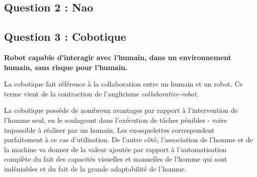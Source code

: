 \subsection{Question 2 : Nao}

\subsection{Question 3 : Cobotique}

\textbf{Robot capable d'interagir avec l'humain, dans un environnement humain, sans
risque pour l'humain.}

La cobotique fait référence à la collaboration entre un humain et un robot.
Ce terme vient de la contraction de l'anglicisme \emph{collaborative-robot}.

La cobotique possède de nombreux avantages par rapport à l'intervention de
l'homme seul, en le soulageant dans l'exécution de tâches pénibles - voire
impossible à réaliser par un humain. Les exosquelettes correspondent
parfaitement à ce cas d'utilisation.
De l'autre côté, l'association de l'homme et de la machine va donner de la
valeur ajoutée par rapport à l'automatisation complète du fait des capacités
visuelles et manuelles de l'homme qui sont indéniables et du fait de la grande
adaptabilité de l'homme.
